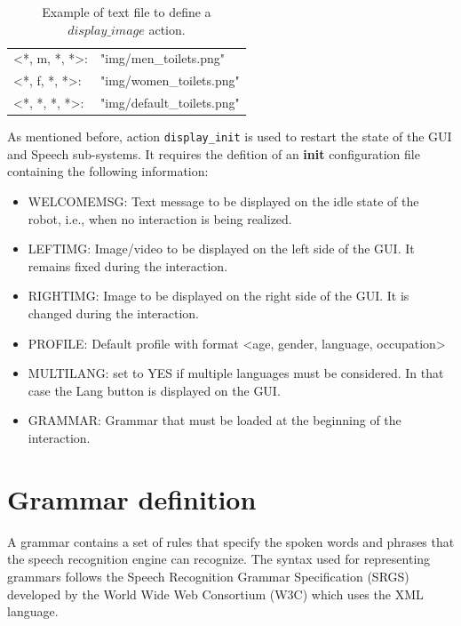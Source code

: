 \documentclass[11pt,a4paper]{article}
\begin{document}
\begin{table}[h]
{\ttfamily
\begin{center}
  \begin{tabular}{|ll|}
    \hline
<*, m, *, *>:  &"img/men\_toilets.png"\\
<*, f, *, *>:  &"img/women\_toilets.png"\\
<*, *, *, *>:  &"img/default\_toilets.png"\\
    \hline
  \end{tabular}
\end{center}
}
    \caption{Example of text file to define a $display\_image$ action.}
    \label{tab:imageFileExample}   
\end{table}

As mentioned before, action {\tt display\_init} is used to restart the state of the GUI and Speech sub-systems. It requires the defition of an \textbf{init} configuration file containing the following information:
\begin{itemize}
\item WELCOMEMSG: Text message to be displayed on the idle state of the robot, i.e., when no interaction is being realized.
\item LEFTIMG: Image/video to be displayed on the left side of the GUI. It remains fixed during the interaction.
\item RIGHTIMG: Image to be displayed on the right side of the GUI. It is changed during the interaction.
\item PROFILE: Default profile with format <age, gender, language, occupation>
\item MULTILANG: set to YES if multiple languages must be considered. In that case the Lang button is displayed on the GUI.
\item GRAMMAR: Grammar that must be loaded at the beginning of the interaction.
\end{itemize}


\section{Grammar definition}
\label{sec:grammardef}

A grammar contains a set of rules that specify the spoken words and phrases that the speech recognition engine can recognize. The syntax used for representing grammars follows the Speech Recognition
Grammar Specification (SRGS) developed by the World Wide Web Consortium (W3C) which uses the XML language.
\end{document}
